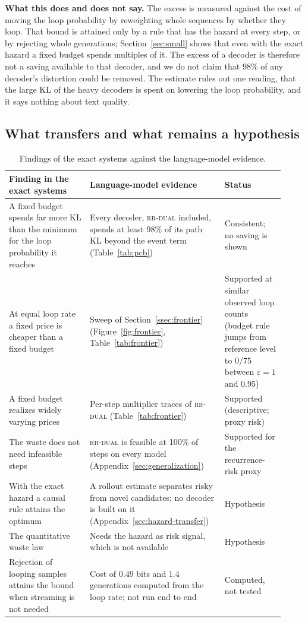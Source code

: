 \documentclass[make,article,submit,pdftex]{Definitions/mdpi}
\begin{document}
\textbf{What this does and does not say.} The excess is measured against the cost of moving the loop probability by reweighting whole sequences by whether they loop. That bound is attained only by a rule that has the hazard at every step, or by rejecting whole generations; Section~\ref{sec:small} shows that even with the exact hazard a fixed budget spends multiples of it. The excess of a decoder is therefore not a saving available to that decoder, and we do not claim that 98\% of any decoder's distortion could be removed. The estimate rules out one reading, that the large KL of the heavy decoders is spent on lowering the loop probability, and it says nothing about text quality.

\subsection{What transfers and what remains a hypothesis}\label{ssec:transfer}
\begin{table}[H]
\centering
\caption{Findings of the exact systems against the language-model evidence.}
\label{tab:transfer}
\small
\begin{tabular}{@{}p{0.27\linewidth}p{0.45\linewidth}p{0.20\linewidth}@{}}
\toprule
Finding in the exact systems & Language-model evidence & Status \\
\midrule
A fixed budget spends far more KL than the minimum for the loop probability it reaches & Every decoder, \textsc{rr-dual} included, spends at least 98\% of its path KL beyond the event term (Table~\ref{tab:pcb}) & Consistent; no saving is shown \\
At equal loop rate a fixed price is cheaper than a fixed budget & Sweep of Section~\ref{ssec:frontier} (Figure~\ref{fig:frontier}, Table~\ref{tab:frontier}) & Supported at similar observed loop counts (budget rule jumps from reference level to 0/75 between $\varepsilon=1$ and 0.95) \\
A fixed budget realizes widely varying prices & Per-step multiplier traces of \textsc{rr-dual} (Table~\ref{tab:frontier}) & Supported (descriptive; proxy risk) \\
The waste does not need infeasible steps & \textsc{rr-dual} is feasible at 100\% of steps on every model (Appendix~\ref{sec:generalization}) & Supported for the recurrence-risk proxy \\
With the exact hazard a causal rule attains the optimum & A rollout estimate separates risky from novel candidates; no decoder is built on it (Appendix~\ref{sec:hazard-transfer}) & Hypothesis \\
The quantitative waste law & Needs the hazard as risk signal, which is not available & Hypothesis \\
Rejection of looping samples attains the bound when streaming is not needed & Cost of 0.49 bits and 1.4 generations computed from the loop rate; not run end to end & Computed, not tested \\
\bottomrule
\end{tabular}
\end{table}
\end{document}
